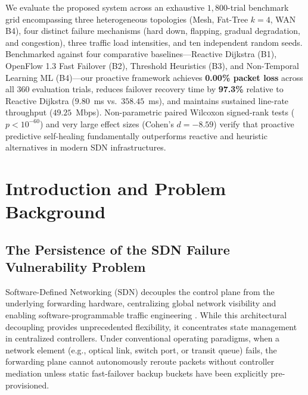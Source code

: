 \documentclass[11pt,a4paper]{report}
\begin{document}
\vspace{0.4cm}
\noindent We evaluate the proposed system across an exhaustive $1{,}800$-trial benchmark grid encompassing three heterogeneous topologies (Mesh, Fat-Tree $k=4$, WAN B4), four distinct failure mechanisms (hard down, flapping, gradual degradation, and congestion), three traffic load intensities, and ten independent random seeds. Benchmarked against four comparative baselines---Reactive Dijkstra (B1), OpenFlow 1.3 Fast Failover (B2), Threshold Heuristics (B3), and Non-Temporal Learning ML (B4)---our proactive framework achieves \textbf{0.00\% packet loss} across all 360 evaluation trials, reduces failover recovery time by \textbf{97.3\%} relative to Reactive Dijkstra ($9.80$~ms vs.\ $358.45$~ms), and maintains sustained line-rate throughput ($49.25$~Mbps). Non-parametric paired Wilcoxon signed-rank tests ($p < 10^{-60}$) and very large effect sizes (Cohen's $d = -8.59$) verify that proactive predictive self-healing fundamentally outperforms reactive and heuristic alternatives in modern SDN infrastructures.

\newpage
{}
\setcounter{page}{1}

\tableofcontents
\newpage

\listoffigures
\newpage

\listoftables
\newpage

\chapter{Introduction and Problem Background}

\section{The Persistence of the SDN Failure Vulnerability Problem}
Software-Defined Networking (SDN) decouples the control plane from the underlying forwarding hardware, centralizing global network visibility and enabling software-programmable traffic engineering \cite{mckeown2008openflow}. While this architectural decoupling provides unprecedented flexibility, it concentrates state management in centralized controllers. Under conventional operating paradigms, when a network element (e.g., optical link, switch port, or transit queue) fails, the forwarding plane cannot autonomously reroute packets without controller mediation unless static fast-failover backup buckets have been explicitly pre-provisioned.
\end{document}
